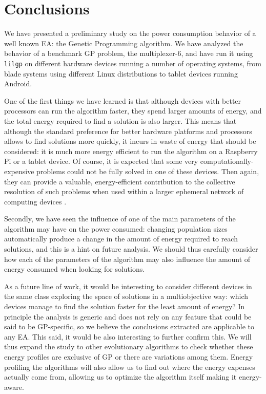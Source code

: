 \section{Conclusions}
\label{conclusions}

We have presented a preliminary study on the power consumption
behavior of a well known EA: the Genetic Programming algorithm.  We
have analyzed the behavior of a benchmark GP problem, the
multiplexer-6, and have run it using {\tt lilgp} on different
hardware devices running a number of operating systems, from blade
systems using different Linux distributions to tablet devices running
Android. 

One of the first things we have learned is that although devices with
better processors can run the algorithm faster, they spend
larger amounts of energy, and the total energy required to find a
solution is also larger.  This means that although the standard
preference for better hardware platforms and processors allows to find
solutions more quickly, it incurs in waste of energy that should be
considered:  it is much more energy efficient to run the algorithm on
a Raspberry Pi or a tablet device. Of course, it is expected that some very 
computationally-expensive problems could not be fully solved in one
of these devices. Then again, they can provide a valuable, energy-efficient
contribution to the collective resolution of such problems when used
within a larger ephemeral network of computing devices \cite{ephemeral2015}.

Secondly, we have seen the influence of one of the main parameters
of the algorithm may have on the power consumed:  changing population
sizes automatically produce a change in the amount of energy required to reach
solutions, and this is a hint on future analysis.  We should thus carefully
consider how each of the parameters of the algorithm may also
influence the amount of energy consumed when looking for solutions. 

As a future line of work, it would be interesting to consider
different devices in the same class exploring the space of
solutions in a multiobjective way: which devices manage to find the
solution faster for the least amount of energy?  In principle the analysis
is generic and does not rely on any 
feature that could be said to be GP-specific, so we believe the conclusions
extracted are applicable to any EA.  This said, it would be also interesting to further confirm
this. We will thus expand the study
to other evolutionary algorithms to check whether these energy
profiles are exclusive of GP or there are variations
among them. Energy profiling the algorithms will also allow us to find
out where the energy expenses actually come from, allowing us to
optimize the algorithm itself making it energy-aware.
